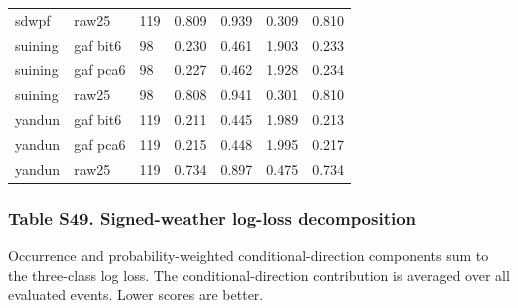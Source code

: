 \documentclass[a4paper,11pt]{article}
\begin{document}
{\begin{longtable}[]{@{}lllllll@{}}
sdwpf & raw25 & 119 & 0.809 & 0.939 & 0.309 & 0.810 \\
suining & gaf bit6 & 98 & 0.230 & 0.461 & 1.903 & 0.233 \\
suining & gaf pca6 & 98 & 0.227 & 0.462 & 1.928 & 0.234 \\
suining & raw25 & 98 & 0.808 & 0.941 & 0.301 & 0.810 \\
yandun & gaf bit6 & 119 & 0.211 & 0.445 & 1.989 & 0.213 \\
yandun & gaf pca6 & 119 & 0.215 & 0.448 & 1.995 & 0.217 \\
yandun & raw25 & 119 & 0.734 & 0.897 & 0.475 & 0.734 \\
\end{longtable}
}

\subsubsection{Table S49. Signed-weather log-loss decomposition}\label{table-s49.-signed-weather-log-loss-decomposition}

Occurrence and probability-weighted conditional-direction components sum to the three-class log loss. The conditional-direction contribution is averaged over all evaluated events. Lower scores are better.
\end{document}
